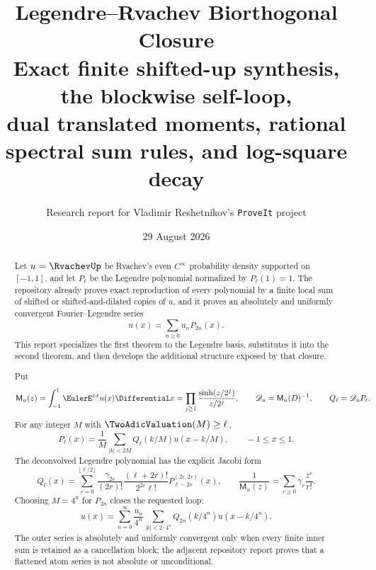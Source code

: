 \documentclass[11pt,oneside]{article}
\title{\bfseries Legendre--Rvachev Biorthogonal Closure\\[0.45em]
\large Exact finite shifted-up synthesis, the blockwise self-loop,\\
dual translated moments, rational spectral sum rules, and log-square decay}
\author{Research report for Vladimir Reshetnikov's \texttt{ProveIt} project}
\date{29 August 2026}
\numberwithin{equation}{section}
\theoremstyle{definition}
\theoremstyle{remark}
\newcommand{\MM}{\mathsf M}
\newcommand{\Dscr}{\mathscr D_u}
\begin{document}
\maketitle

\begin{abstract}
Let $u=\RvachevUp$ be Rvachev's even $C^\infty$ probability density supported on
$[-1,1]$, and let $P_\ell$ be the Legendre polynomial normalized by
$P_\ell(1)=1$.  The repository already proves exact reproduction of every
polynomial by a finite local sum of shifted or shifted-and-dilated copies of
$u$, and it proves an absolutely and uniformly convergent Fourier--Legendre
series
\[
 u(x)=\sum_{n\ge0}u_nP_{2n}(x).
\]
This report specializes the first theorem to the Legendre basis, substitutes
it into the second theorem, and then develops the additional structure exposed
by that closure.

Put
\[
 \MM_u(z)=\int_{-1}^{1}\EulerE^{zx}u(x)\Differential x
 =\prod_{j\ge1}\frac{\sinh(z/2^j)}{z/2^j},
 \qquad
 \Dscr=\MM_u(D)^{-1},
 \qquad Q_\ell=\Dscr P_\ell.
\]
For any integer $M$ with $\TwoAdicValuation(M)\ge\ell$,
\[
 P_\ell(x)=\frac1M\sum_{|k|<2M}Q_\ell(k/M)u(x-k/M),
 \qquad -1\le x\le1.
\]
The deconvolved Legendre polynomial has the explicit Jacobi form
\[
 Q_\ell(x)=\sum_{r=0}^{\lfloor\ell/2\rfloor}
 \frac{\gamma_{2r}}{(2r)!}
 \frac{(\ell+2r)!}{2^{2r}\ell!}
 P_{\ell-2r}^{(2r,2r)}(x),
 \qquad
 \frac1{\MM_u(z)}=\sum_{r\ge0}\gamma_r\frac{z^r}{r!}.
\]
Choosing $M=4^n$ for $P_{2n}$ closes the requested loop:
\[
 u(x)=\sum_{n=0}^{\infty}\frac{u_n}{4^n}
 \sum_{|k|<2\cdot4^n}Q_{2n}(k/4^n)u(x-k/4^n).
\]
The outer series is absolutely and uniformly convergent only when every finite
inner sum is retained as a cancellation block; the adjacent repository report
proves that a flattened atom series is not absolute or unconditional.


\end{abstract}
\end{document}

